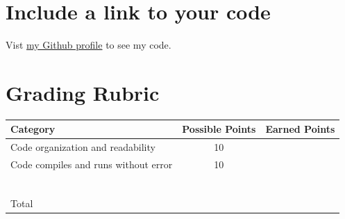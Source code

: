 \documentclass{exam}
\begin{document}
\section{Include a link to your code}
Vist \href{https://github.com/jramsey-rutledge}{my Github profile} to see my code.


\section{Grading Rubric}
\begin{center}
\begin{tabular}{|l|c|c|} %
\hline
Category & Possible Points & Earned Points \\
\hline
 Code organization and readability & 10 & \\
 Code compiles and runs without error &  10 & \\ 
 &  &  \\
 &  & \\
 &  & \\
 &  &  \\
 &  & \\
 &  & \\
\hline
Total &  &  \\
\hline
\end{tabular}
\end{center}
\end{document}

